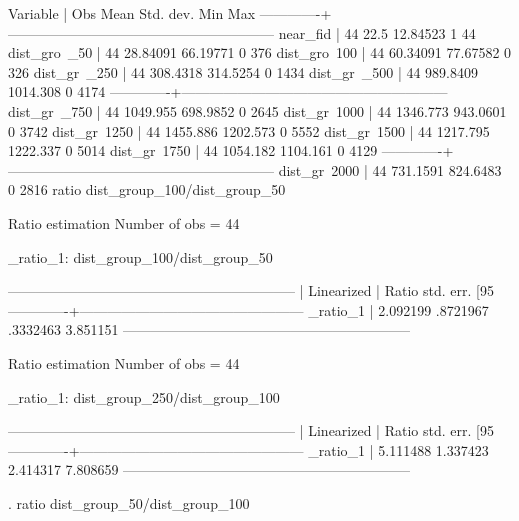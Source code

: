 \documentclass[12pt]{article}
\begin{document}
    Variable |        Obs        Mean    Std. dev.       Min        Max
-------------+---------------------------------------------------------
    near_fid |         44        22.5    12.84523          1         44
dist_gro~_50 |         44    28.84091    66.19771          0        376
dist_gro~100 |         44    60.34091    77.67582          0        326
dist_gr~_250 |         44    308.4318    314.5254          0       1434
dist_gr~_500 |         44    989.8409    1014.308          0       4174
-------------+---------------------------------------------------------
dist_gr~_750 |         44    1049.955    698.9852          0       2645
dist_gr~1000 |         44    1346.773    943.0601          0       3742
dist_gr~1250 |         44    1455.886    1202.573          0       5552
dist_gr~1500 |         44    1217.795    1222.337          0       5014
dist_gr~1750 |         44    1054.182    1104.161          0       4129
-------------+---------------------------------------------------------
dist_gr~2000 |         44    731.1591    824.6483          0       2816
ratio dist_group_100/dist_group_50

Ratio estimation                            Number of obs = 44

     _ratio_1: dist_group_100/dist_group_50

--------------------------------------------------------------
             |             Linearized
             |      Ratio   std. err.     [95%
-------------+------------------------------------------------
    _ratio_1 |   2.092199   .8721967      .3332463    3.851151
--------------------------------------------------------------

Ratio estimation                            Number of obs = 44

     _ratio_1: dist_group_250/dist_group_100

--------------------------------------------------------------
             |             Linearized
             |      Ratio   std. err.     [95%
-------------+------------------------------------------------
    _ratio_1 |   5.111488   1.337423      2.414317    7.808659
--------------------------------------------------------------

. ratio dist_group_50/dist_group_100

\end{document}
